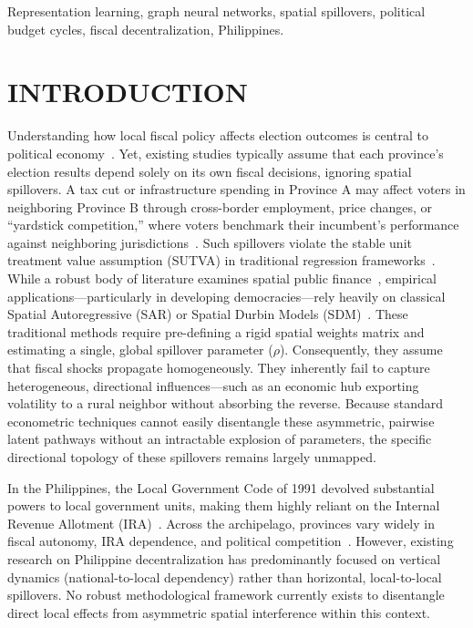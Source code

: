 \documentclass[conference]{IEEEtran}
\begin{document}
\begin{IEEEkeywords}
Representation learning, graph neural networks, spatial spillovers, political budget cycles, fiscal decentralization, Philippines.
\end{IEEEkeywords}

\section{INTRODUCTION}

Understanding how local fiscal policy affects election outcomes is central to political economy~\cite{alt2010political, drazen2006political}. Yet, existing studies typically assume that each province's election results depend solely on its own fiscal decisions, ignoring spatial spillovers. A tax cut or infrastructure spending in Province A may affect voters in neighboring Province B through cross-border employment, price changes, or ``yardstick competition,'' where voters benchmark their incumbent's performance against neighboring jurisdictions~\cite{besley1995incumbent}. Such spillovers violate the stable unit treatment value assumption (SUTVA) in traditional regression frameworks~\cite{imbens2015causal}. While a robust body of literature examines spatial public finance~\cite{revelli2005on}, empirical applications—particularly in developing democracies—rely heavily on classical Spatial Autoregressive (SAR) or Spatial Durbin Models (SDM)~\cite{lesage2009introduction}. These traditional methods require pre-defining a rigid spatial weights matrix and estimating a single, global spillover parameter ($\rho$). Consequently, they assume that fiscal shocks propagate homogeneously. They inherently fail to capture heterogeneous, directional influences—such as an economic hub exporting volatility to a rural neighbor without absorbing the reverse. Because standard econometric techniques cannot easily disentangle these asymmetric, pairwise latent pathways without an intractable explosion of parameters, the specific directional topology of these spillovers remains largely unmapped.

In the Philippines, the Local Government Code of 1991 devolved substantial powers to local government units, making them highly reliant on the Internal Revenue Allotment (IRA)~\cite{lgc1991}. Across the archipelago, provinces vary widely in fiscal autonomy, IRA dependence, and political competition~\cite{uchimura2009measuring, hutchcroft2012reslicing, panao2021beyond, lee2023ira}. However, existing research on Philippine decentralization has predominantly focused on vertical dynamics (national-to-local dependency) rather than horizontal, local-to-local spillovers. No robust methodological framework currently exists to disentangle direct local effects from asymmetric spatial interference within this context.
\end{document}
